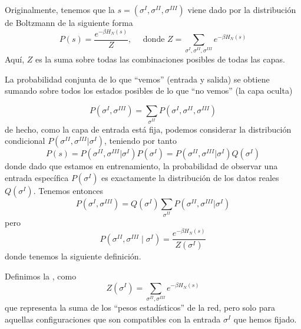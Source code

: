 \noindent
\begin{definicion}
    Originalmente, tenemos que la  \mbox{$s = (\sigma^I, \sigma^{II}, \sigma^{III})$} viene dado por la distribución de Boltzmann de la siguiente forma
    \begin{equation*}
        P(s)=\dfrac{e^{-\beta H_N(s)}}{Z}, \quad \text{ donde } Z = \sum_{\sigma^I, \sigma^{II}, \sigma^{III}} e^{-\beta H_N(s)}
    \end{equation*}
    Aquí, $Z$ es la suma sobre todas las combinaciones posibles de todas las capas.
\end{definicion}

\noindent
La probabilidad conjunta de lo que ``vemos'' (entrada y salida) se obtiene sumando sobre todos los estados posibles de lo que ``no vemos'' (la capa oculta)

\begin{equation*}
    P(\sigma^I, \sigma^{III}) = \sum_{\sigma^{II}} P(\sigma^I, \sigma^{II}, \sigma^{III})
\end{equation*}
de hecho, como la capa de entrada está fija, podemos considerar la distribución condicional $P(\sigma^{II}, \sigma^{III} | \sigma^I)$, teniendo por tanto
\begin{equation*}
    P(s)=P(\sigma^{II}, \sigma^{III} | \sigma^I) P(\sigma^I)=P(\sigma^{II}, \sigma^{III} | \sigma^I) Q(\sigma^I)
\end{equation*}
donde dado que estamos en entrenamiento, la probabilidad de observar una entrada específica $P(\sigma^I)$ es exactamente la distribución de los datos reales $Q(\sigma^I)$. Tenemos entonces
\begin{equation*}
    P(\sigma^I, \sigma^{III})=Q(\sigma^I) \sum_{\sigma^{II}} P(\sigma^{II}, \sigma^{III} | \sigma^I) 
\end{equation*}
pero 
\begin{equation*}
    P(\sigma^{II}, \sigma^{III}\mid \sigma^{I}) = \dfrac{e^{-\beta H_N(s)}}{Z(\sigma^I)}
\end{equation*}
donde tenemos la siguiente definición.

\begin{definicion}
    Definimos la , como 
    \begin{equation*}
        Z(\sigma^I) = \sum_{\sigma^{II}, \sigma^{III}} e^{-\beta H_N(s)}
    \end{equation*}
    que representa la suma de los ``pesos estadísticos'' de la red, pero solo para aquellas configuraciones que son compatibles con la entrada $\sigma^I$ que hemos fijado. \\
\end{definicion}

